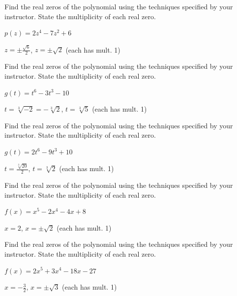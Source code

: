 \documentclass{ximera}
\begin{document}
\begin{problem}
Find the real zeros of the polynomial using the techniques specified by your instructor.  State the multiplicity of each real zero.

$p(z) = 2z^4-7z^2+6$

\begin{solution}
$z = \pm \frac{\sqrt{6}}{2}$, $z = \pm \sqrt{2}$ (each has mult. 1)
\end{solution}

\end{problem}

\begin{problem}
Find the real zeros of the polynomial using the techniques specified by your instructor.  State the multiplicity of each real zero.

$g(t) = t^6-3t^3-10$

\begin{solution}
$t = \sqrt[3]{-2} = -\sqrt[3]{2}$, $t = \sqrt[3]{5}$ (each has mult. 1)
\end{solution}
\end{problem}

\begin{problem}
Find the real zeros of the polynomial using the techniques specified by your instructor.  State the multiplicity of each real zero.

$g(t) = 2t^6-9t^3+10$

\begin{solution}
$t =\frac{\sqrt[3]{20}}{2} $, $t = \sqrt[3]{2}$ (each has mult. 1)
\end{solution}

\end{problem}

\begin{problem}
Find the real zeros of the polynomial using the techniques specified by your instructor.  State the multiplicity of each real zero.

$f(x) = x^5-2x^4-4x+8$

\begin{solution}
$x = 2$, $x = \pm \sqrt{2}$ (each has mult. 1)
\end{solution}

\end{problem}

\begin{problem}\label{findrealzerosexerlast}
Find the real zeros of the polynomial using the techniques specified by your instructor.  State the multiplicity of each real zero.

$f(x) = 2x^5+3x^4-18x-27$ 

\begin{solution}
$x = -\frac{3}{2}$, $x = \pm \sqrt{3}$ (each has mult. 1)
\end{solution}

\end{problem}
\end{document}
